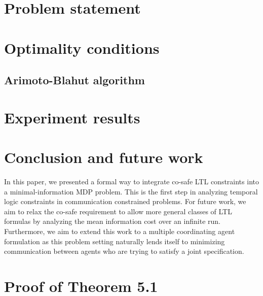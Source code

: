 \documentclass[letterpaper, 10 pt, conference]{ieeeconf}  %
\begin{document}





\section{Problem statement}





\section{Optimality conditions}



\subsection{Arimoto-Blahut algorithm}


%


\section{Experiment results}\label{sec:exp}


\section{Conclusion and future work}
In this paper, we presented a formal way to integrate co-safe LTL constraints into a minimal-information MDP problem. This is the first step in analyzing temporal logic constraints in communication constrained problems. For future work, we aim to relax the co-safe requirement to allow more general classes of LTL formulas by analyzing the mean information cost over an infinite run. Furthermore, we aim to extend this work to a multiple coordinating agent formulation as this problem setting naturally lends itself to minimizing communication between agents who are trying to satisfy a joint specification. 






\appendices
\vspace{-0.15cm}
\section{Proof of Theorem 5.1} \label{sec:prf}

\end{document}
